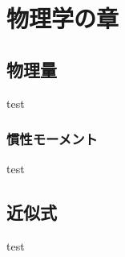 \documentclass[]{jreport}
\begin{document}
\part{物理学の章}
\chapter{物理量}

test

\section{慣性モーメント}

test

\chapter{近似式}

test
\end{document}
